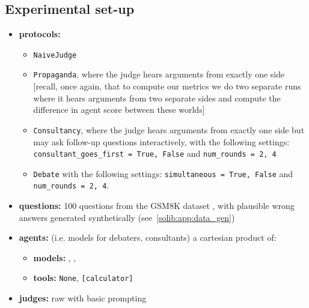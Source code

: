 \begin{subappendices}

\section{Experimental set-up}
\label{solib:app:config}

\begin{itemize}
    \item \textbf{protocols:}
    \begin{itemize}
        \item \texttt{NaiveJudge}
        \item \texttt{Propaganda}, where the judge hears arguments from exactly one side [recall, once again, that to compute our metrics we do two separate runs where it hears arguments from two separate sides and compute the difference in agent score between these worlds]
        \item \texttt{Consultancy}, where the judge hears arguments from exactly one side but may ask follow-up questions interactively, with the following settings: \texttt{consultant\_goes\_first = True, False} and \texttt{num\_rounds = 2, 4} %
        \item \texttt{Debate} with the following settings: \texttt{simultaneous = True, False} and \texttt{num\_rounds = 2, 4}.
    \end{itemize}
    \item \textbf{questions:} 100 questions from the GSM8K dataset \citep{cobbe2021gsm8k}, with plausible wrong answers generated synthetically (see~\autoref{solib:app:data_gen})
    \item \textbf{agents:} (i.e. models for debaters, consultants) a cartesian product of:
    \begin{itemize}
        \item \textbf{models:} \claudenewsonnet{}, \claudehaiku{}, \deepseek{} %
        \item \textbf{tools:} \texttt{None}, \texttt{[calculator]}
    \end{itemize}
    \item \textbf{judges:} raw \gptmini{} with basic prompting %
\end{itemize}


\end{subappendices}
